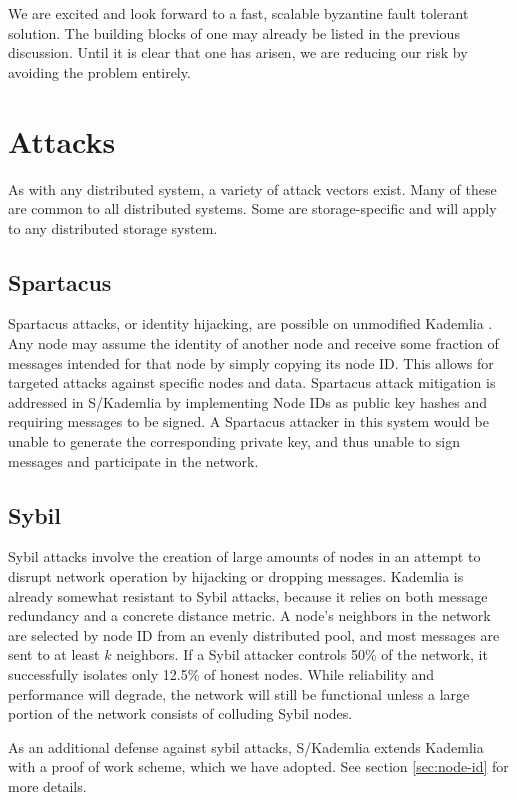 \documentclass[8pt,fleqn,openany]{book}
\begin{document}
We are excited and look forward to a fast, scalable byzantine fault tolerant
solution. The building blocks of one may already be listed in the previous
discussion. Until it is clear that one has arisen, we are reducing our risk
by avoiding the problem entirely.

\chapter{Attacks}

As with any distributed system, a variety of attack vectors exist. Many of these
are common to all distributed systems. Some are storage-specific and will apply
to any distributed storage system.

\section{Spartacus}

Spartacus attacks, or identity hijacking, are possible on unmodified Kademlia
\cite{kad}.
Any node may assume the identity of another node and receive some fraction of
messages intended for that node by simply copying its node ID.
This allows for targeted attacks against specific nodes and data.
Spartacus attack mitigation is addressed in S/Kademlia \cite{skad} by
implementing Node IDs as public key hashes and requiring messages to be signed.
A Spartacus attacker in this system would be unable to generate the
corresponding private key, and thus unable to sign messages and participate in
the network.

\section{Sybil}

Sybil attacks involve the creation of large amounts of nodes in an attempt to
disrupt network operation by hijacking or dropping messages. Kademlia
\cite{kad} is already somewhat resistant to Sybil attacks, because
it relies on both message redundancy and a concrete distance metric.
A node's neighbors in the network are selected by
node ID from an evenly distributed pool, and most messages are sent to at least
$k$ neighbors. If a Sybil attacker controls 50\% of the network, it
successfully isolates only 12.5\% of honest nodes. While reliability and
performance will degrade, the network will still be functional unless a large
portion of the network consists of colluding Sybil nodes.

As an additional defense against sybil attacks, S/Kademlia \cite{skad}
extends Kademlia with a proof of work scheme, which we have adopted. See section
\ref{sec:node-id} for more details.
\end{document}
